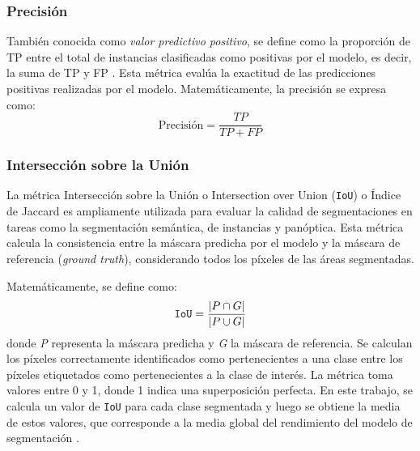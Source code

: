 \subsubsection{Precisión}
También conocida como \textit{valor predictivo positivo}, se define como la proporción de TP entre el total de instancias clasificadas como positivas por el modelo, es decir, la suma de TP y FP \cite{Hossin2015precision}. Esta métrica evalúa la exactitud de las predicciones positivas realizadas por el modelo.
Matemáticamente, la precisión se expresa como: 
\begin{equation}
    \text{Precisión} = \frac{TP}{TP+FP}
\end{equation}
\subsubsection{Intersección sobre la Unión}
La métrica Intersección sobre la Unión o Intersection over Union (\texttt{IoU}) o Índice de Jaccard es ampliamente utilizada para evaluar la calidad de segmentaciones en tareas como la segmentación semántica, de instancias y panóptica. Esta métrica calcula la consistencia entre la máscara predicha por el modelo y la máscara de referencia (\textit{ground truth}), considerando todos los píxeles de las áreas segmentadas.

Matemáticamente, se define como:
\begin{equation}
    \text{\texttt{IoU}} = \frac{|P \cap G|}{|P \cup G|}
\end{equation}
donde \textit{P} representa la máscara predicha y \textit{G} la máscara de referencia. Se calculan los píxeles correctamente identificados como pertenecientes a una clase entre los píxeles etiquetados como pertenecientes a la clase de interés. La métrica toma valores entre 0 y 1, donde 1 indica una superposición perfecta. En este trabajo, se calcula un valor de \texttt{IoU} para cada clase segmentada y luego se obtiene la media de estos valores, que corresponde a la media global del rendimiento del modelo de segmentación \cite{cheng2021iou}.



